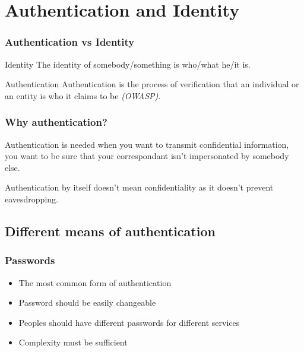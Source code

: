 \section{Authentication and Identity}

\begin{frame}
\frametitle{Authentication vs Identity}
\begin{block}{Identity}
The identity of somebody/something is who/what he/it is.
\end{block}
\begin{block}{Authentication} Authentication is the process of
  verification that an individual or an entity is who it claims to
  be \textit{(OWASP)}. 
\end{block}
\end{frame}


\begin{frame}
\frametitle{Why authentication?}

Authentication is needed when you want to transmit confidential
information, you want to be sure that your correspondant isn't
impersonated by somebody else.

Authentication by itself doesn't mean confidentiality as it doesn't
prevent eavesdropping.

\end{frame}


\subsection{Different means of authentication}

\begin{frame}
\frametitle{Passwords}

\begin{itemize}
\item The most common form of authentication
\item Password should be easily changeable
\item Peoples should have different passwords for different services
\item Complexity must be sufficient
\end{itemize}
\end{frame}



